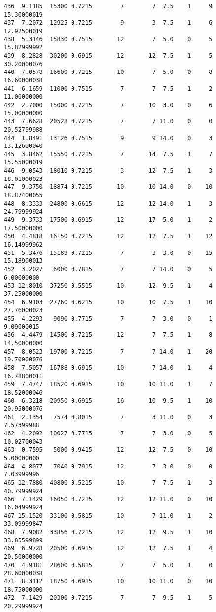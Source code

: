 \documentclass[
  letterpaper,
  DIV=11,
  numbers=noendperiod]{scrreprt}
\begin{document}
\begin{verbatim}
436  9.1185  15300 0.7215        7        7  7.5    1     9 15.30000019
437  7.2072  12925 0.7215        9        3  7.5    1     6 12.92500019
438  5.3146  15830 0.7515       12        7  5.0    0     5 15.82999992
439  8.2828  30200 0.6915       12       12  7.5    1     5 30.20000076
440  7.0578  16600 0.7215       10        7  5.0    0     8 16.60000038
441  6.1659  11000 0.7515        7        7  7.5    1     2 11.00000000
442  2.7000  15000 0.7215        7       10  3.0    0     6 15.00000000
443  7.6628  20528 0.7215        7        7 11.0    0     0 20.52799988
444  1.8491  13126 0.7515        9        9 14.0    0     3 13.12600040
445  3.8462  15550 0.7215        7       14  7.5    1     7 15.55000019
446  9.0543  18010 0.7215        3       12  7.5    1     3 18.01000023
447  9.3750  18874 0.7215       10       10 14.0    0    10 18.87400055
448  8.3333  24800 0.6615       12       12 14.0    1     3 24.79999924
449  9.3733  17500 0.6915       12       17  5.0    1     2 17.50000000
450  4.4818  16150 0.7215       12       12  7.5    1    12 16.14999962
451  5.3476  15189 0.7215        7        3  3.0    0    15 15.18900013
452  3.2027   6000 0.7815        7        7 14.0    0     5  6.00000000
453 12.8010  37250 0.5515       10       12  9.5    1     4 37.25000000
454  6.9103  27760 0.6215       10       10  7.5    1    10 27.76000023
455  4.2293   9090 0.7715        7        7  3.0    0     1  9.09000015
456  4.4479  14500 0.7215       12        7  7.5    1     8 14.50000000
457  8.0523  19700 0.7215        7        7 14.0    1    20 19.70000076
458  7.5057  16788 0.6915       10        7 14.0    1     4 16.78800011
459  7.4747  18520 0.6915       10       10 11.0    1     7 18.52000046
460  6.3218  20950 0.6915       16       10  9.5    1    10 20.95000076
461  2.1354   7574 0.8015        7        3 11.0    0     3  7.57399988
462  4.2092  10027 0.7715        7        7  3.0    0     5 10.02700043
463  0.7595   5000 0.9415       12       12  7.5    0    10  5.00000000
464  4.8077   7040 0.7915       12        7  3.0    0     0  7.03999996
465 12.7880  40800 0.5215       10        7  7.5    1     3 40.79999924
466  7.1429  16050 0.7215       12       12 11.0    0    10 16.04999924
467 15.1520  33100 0.5815       10        7 11.0    1     2 33.09999847
468  7.9082  33856 0.7215       12       12  9.5    1    10 33.85599899
469  6.9728  20500 0.6915       12       12  7.5    1     4 20.50000000
470  4.9181  28600 0.5815        7        7  5.0    1     0 28.60000038
471  8.3112  18750 0.6915       10       10 11.0    0    10 18.75000000
472  7.1429  20300 0.7215        7        7  9.5    1     5 20.29999924

\end{verbatim}
\end{document}
